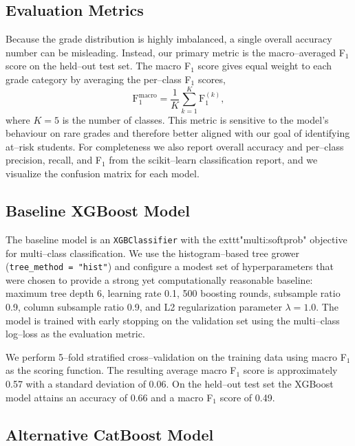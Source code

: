 \documentclass[11pt]{article}
\begin{document}
\subsection{Evaluation Metrics}

Because the grade distribution is highly imbalanced, a single overall
accuracy number can be misleading.  Instead, our primary metric is the
macro--averaged F$_1$ score on the held--out test set.  The macro
F$_1$ score gives equal weight to each grade category by averaging the
per--class F$_1$ scores,
\begin{equation*}
		\text{F}_1^{\text{macro}} = \frac{1}{K} \sum_{k=1}^K \text{F}_1^{(k)},
\end{equation*}
where $K=5$ is the number of classes.  This metric is sensitive to the
model's behaviour on rare grades and therefore better aligned with our
goal of identifying at--risk students.  For completeness we also
report overall accuracy and per--class precision, recall, and F$_1$
from the scikit--learn classification report, and we visualize the
confusion matrix for each model.

\subsection{Baseline XGBoost Model}

The baseline model is an \texttt{XGBClassifier} with the
	exttt{"multi:softprob"} objective for multi--class classification.
We use the histogram--based tree grower (\texttt{tree\_method =
"hist"}) and configure a modest set of hyperparameters that were
chosen to provide a strong yet computationally reasonable baseline:
maximum tree depth 6, learning rate 0.1, 500 boosting rounds,
subsample ratio 0.9, column subsample ratio 0.9, and L2 regularization
parameter $\lambda = 1.0$.  The model is trained with early stopping
on the validation set using the multi--class log--loss as the
evaluation metric.

We perform 5--fold stratified cross--validation on the training data
using macro F$_1$ as the scoring function.  The resulting average
macro F$_1$ score is approximately 0.57 with a standard deviation of
0.06.  On the held--out test set the XGBoost model attains an
accuracy of 0.66 and a macro F$_1$ score of 0.49.

\subsection{Alternative CatBoost Model}
\end{document}
